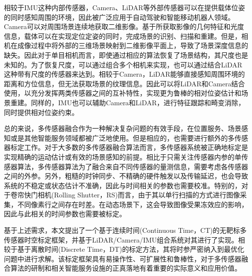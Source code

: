 相较于IMU这种内部传感器，Camera、LiDAR等外部传感器可以在提供载体位姿的同时感知周围的环境，因此被广泛应用于自动驾驶和智能移动机器人领域。Camera可以对周围场景连续地获取二维影像。基于所获取影像的几何特征和光度信息，载体可以在实现定位定姿的同时，完成场景的识别、扫描和重建。但是，相机在成像过程中将外部的三维场景映射到二维影像平面上，导致了场景深度信息的缺失。因此对于单目相机而言，即使通过相应的算法恢复了场景结构，其尺度也是未知的。为了恢复尺度，可以通过组合多个相机来实现，也可以通过结合LiDAR这种带有尺度的传感器来达到。相较于Camera，LiDAR能够直接感知周围环境的距离和方位信息，但无法获取场景的纹理信息。因此可以将LiDAR和Camera结合使用，以充分发挥两类传感器之间的互补特性，实现更为鲁棒的相对位姿估计和场景重建。同样的，IMU也可以辅助Camera和LiDAR，进行特征跟踪和畸变消除，同时提供相对位姿约束。

总的来说，多传感器融合作为一种解决复杂问题的有效手段，在位置服务、场景感知或是其他智能服务领域都被广泛地使用。但是相应的，也需要进行额外的多传感器标定工作。对于大多数的多传感器融合算法而言，多传感器系统被正确地标定是实现精确的运动估计或有效的场景感知的前提。相比于只需关注传感器内参的单传感器算法，多传感器算法为了融合来自不同传感器的量测信息，需要考虑各传感器之间的外参。另外，粗糙的时钟同步、不精确的硬件触发以及传输延迟，也会导致系统的不稳定或状态估计不准确，因此与时间相关的参数也需要校准\cite{yang2019degenerate}。特别的，对于卷帘快门相机(Rolling Shutter，RS)而言，由于其以单行扫描的方式进行图像采集，不同像素行之间存在时差。在动态场景下，这会导致图像受果冻效应的影响，因此与此相关的时间参数也需要被标定。

基于上述需求，本文提出了一个基于连续时间(Continuous Time，CT)的无靶标多传感器时空标定框架，并基于LiDAR/Camera/IMU组合系统对其进行了实现。相较于基于离散时间(Discrete Time，DT)的标定方法，其将时参严密纳入到最优化问题中进行求解。该标定框架具有易操作性、可扩展性和鲁棒性，对于多传感器融合算法的研制和相关智能服务设施的正真落地有着重要的实际意义和应用价值。

\section{}


